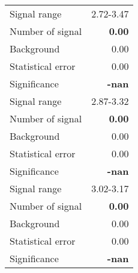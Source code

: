  {\large{
 \begin{tabular}{||l r||}
 \hline
 \hline
Signal range &      2.72-3.47 \\
Number of signal &  \textbf{   0.00} \\
Background &           0.00 \\
Statistical error &    0.00 \\
Significance &      \textbf{   -nan} \\
 \hline
Signal range &      2.87-3.32 \\
Number of signal &  \textbf{   0.00} \\
Background &           0.00 \\
Statistical error &    0.00 \\
Significance &      \textbf{   -nan} \\
 \hline
Signal range &      3.02-3.17 \\
Number of signal &  \textbf{   0.00} \\
Background &           0.00 \\
Statistical error &    0.00 \\
Significance &      \textbf{   -nan} \\
 \hline
 \hline
 \end{tabular}
 }}
 \endinput
